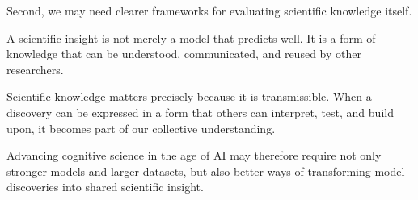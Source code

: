 \documentclass[11pt]{article}
\begin{document}
Second, we may need clearer frameworks for evaluating scientific knowledge itself.

A scientific insight is not merely a model that predicts well. It is a form of knowledge that can be understood, communicated, and reused by other researchers.

Scientific knowledge matters precisely because it is transmissible. When a discovery can be expressed in a form that others can interpret, test, and build upon, it becomes part of our collective understanding.

Advancing cognitive science in the age of AI may therefore require not only stronger models and larger datasets, but also better ways of transforming model discoveries into shared scientific insight.
\end{document}

